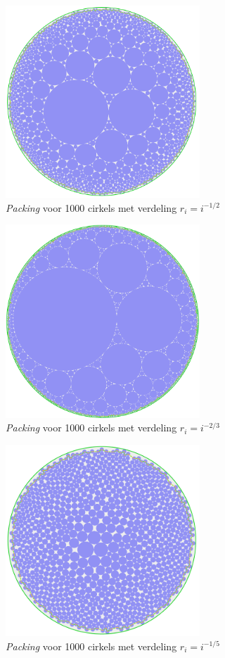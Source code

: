 \documentclass[12pt,a4paper,oneside]{book}
\begin{document}
\begin{figure}
  \centering
  \includegraphics[width=0.65\textwidth]{packing-neg1div2-1000.png}
  \caption{\textit{Packing} voor 1000 cirkels met verdeling $r_i=i^{-1/2}$}
\end{figure}

\begin{figure}
  \centering
  \includegraphics[width=0.65\textwidth]{packing-neg2div3-1000.png}
  \caption{\textit{Packing} voor 1000 cirkels met verdeling $r_i=i^{-2/3}$}
\end{figure}

\begin{figure}
  \centering
  \includegraphics[width=0.65\textwidth]{packing-neg1div5-1000.png}
  \caption{\textit{Packing} voor 1000 cirkels met verdeling $r_i=i^{-1/5}$}
\end{figure}
\end{document}
